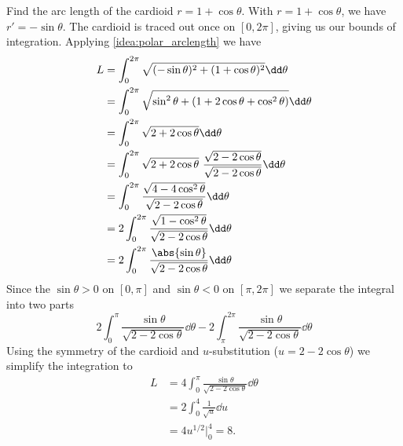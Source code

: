 \begin{example}\label{ex_cardioid_length}
Find the arc length of the cardioid $r=1+\cos \theta$.
\solution
With $r=1+\cos \theta$, we have $r' = -\sin \theta$. The cardioid is traced out once on $[0,2\pi]$, giving us our bounds of integration. Applying \autoref{idea:polar_arclength} we have
\begin{align*}
	L
	& = \int_0^{2\pi} \sqrt{(-\sin \theta)^2  + (1 + \cos \theta)^2}\dd\theta \\
	& = \int_0^{2\pi} \sqrt{\sin^2 \theta + (1 + 2\cos \theta + \cos^2 \theta)}\dd\theta\\
	& = \int_0^{2\pi} \sqrt{2 + 2\cos \theta}\dd\theta\\
	& = \int_0^{2\pi} \sqrt{2 + 2\cos \theta}\ \frac{\sqrt {2-2\cos \theta}}{\sqrt {2-2\cos \theta}}\dd\theta\\
	& = \int_0^{2\pi} \frac{\sqrt{4 - 4\cos^2 \theta}}{\sqrt {2-2\cos \theta}}\dd\theta\\
	& = 2\int_0^{2\pi} \frac{\sqrt{1 - \cos^2 \theta}}{\sqrt {2-2\cos \theta}}\dd\theta\\
	& = 2\int_0^{2\pi} \frac{\abs{\sin\theta}}{\sqrt {2-2\cos \theta}}\dd\theta
\end{align*}
Since the $\sin \theta > 0$ on $[0, \pi]$ and $\sin \theta < 0$ on $[\pi, 2\pi]$ we separate the integral into two parts
\[
2\int_0^{\pi} \frac{\sin \theta}{\sqrt {2-2\cos \theta}}\dd\theta - 2\int_{\pi}^{2\pi} \frac{\sin \theta}{\sqrt {2-2\cos \theta}}\dd\theta
\]
Using the symmetry of the cardioid and $u$-substitution ($u = 2 - 2\cos \theta$) we simplify the integration to
\begin{align*}
L
& = 4\int_0^{\pi} \frac{\sin \theta}{\sqrt {2-2\cos \theta}}\dd\theta\\
& = 2\int_0^4 \frac{1}{\sqrt u}\dd u\\
& = 4  u^{1/2}\biggr|_0^4 = 8.
\end{align*}
\end{example}

